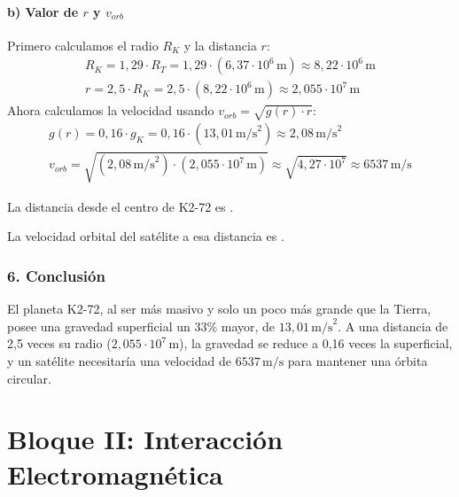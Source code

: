 \paragraph*{b) Valor de $r$ y $v_{orb}$}
Primero calculamos el radio $R_K$ y la distancia $r$:
\begin{gather}
    R_K = 1,29 \cdot R_T = 1,29 \cdot (6,37 \cdot 10^6 \, \text{m}) \approx 8,22 \cdot 10^6 \, \text{m} \\
    r = 2,5 \cdot R_K = 2,5 \cdot (8,22 \cdot 10^6 \, \text{m}) \approx 2,055 \cdot 10^7 \, \text{m}
\end{gather}
Ahora calculamos la velocidad usando $v_{orb} = \sqrt{g(r) \cdot r}$:
\begin{gather}
    g(r) = 0,16 \cdot g_K = 0,16 \cdot (13,01 \, \text{m/s}^2) \approx 2,08 \, \text{m/s}^2 \\
    v_{orb} = \sqrt{(2,08 \, \text{m/s}^2) \cdot (2,055 \cdot 10^7 \, \text{m})} \approx \sqrt{4,27 \cdot 10^7} \approx 6537 \, \text{m/s}
\end{gather}
\begin{cajaresultado}
    La distancia desde el centro de K2-72 es .
\end{cajaresultado}
\begin{cajaresultado}
    La velocidad orbital del satélite a esa distancia es .
\end{cajaresultado}

\subsubsection*{6. Conclusión}
\begin{cajaconclusion}
El planeta K2-72, al ser más masivo y solo un poco más grande que la Tierra, posee una gravedad superficial un 33\% mayor, de $13,01 \, \text{m/s}^2$. A una distancia de 2,5 veces su radio ($2,055 \cdot 10^7 \, \text{m}$), la gravedad se reduce a 0,16 veces la superficial, y un satélite necesitaría una velocidad de $6537 \, \text{m/s}$ para mantener una órbita circular.
\end{cajaconclusion}

\newpage
\section{Bloque II: Interacción Electromagnética}
\label{sec:grav_2020_sep_ext}

